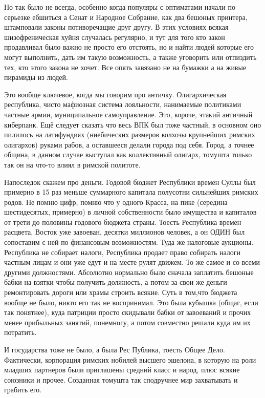 Но так было не всегда, особенно когда популяры с оптиматами начали по серьезке ебшиться а Сенат и Народное Собрание, как два бешоных принтера, штамповали законы потиворечащие друг другу. В этих условиях всякая шизофреническая хуйня случалась регулярно, и тут для того кто закон продавливал было важно не просто его отстоять, но и найти людей которые его могут выполнить, дать им такую возможность, а также уговорить или отпиздить тех, кто этого закона не хочет. Все опять завязано не на бумажки а на живые пирамиды из людей.


Это вообще ключевое, когда мы говорим про античку. Олигархическая республика, чисто мафиозная система лояльности, нанимаемые политиками частные армии, муниципальное самоуправление. Это, короче, этакий античный киберпанк. Ещё следует сказать что весь ВПК был тоже частный, в основном оно пилилось на латифундиях (ниебических размеров колхозы крупнейших римских олигархов) руками рабов, а оставшееся делали города под себя. Город, а точнее община, в данном случае выступал как коллективный олигарх, томушта только так он на что-то влиял в римской политоте.


Напоследок скажем про деньги. Годовой бюджет Республики времен Суллы был примерно в 15 раз меньше суммарного капитала полусотни сильнейших римских родов. Не помню цифр, помню что у одного Красса, на пике (середина шестидесятых, примерно) в личной собственности было имущества и капиталов от трети до половины годового бюджета страны. Тоесть Республика времен расцвета, Восток уже завоеван, десятки миллионов человек, а он ОДИН был сопоставим с ней по финансовым возможностям. Туда же налоговые аукционы. Республика не собирает налоги, Республика продает право собирать налоги частным лицам и они уже едут и на месте рулят движем. То же самое и со всеми другими должностями. Абсолютно нормально было сначала заплатить бешоные бабки на взятки чтобы получить должность, а потом за свои же деньги ремонтировать дороги или храмы строить всякие. Суть в том,что бюджета вообще не было, никто его так не воспринимал. Это была кубышка (общаг, если так понятнее), куда патриции просто скидывали бабки от завоеваний и прочих менее прибыльных занятий, понемногу, а потом совместно решали куда им их потратить.


И государства тоже не было, а была Рес Публика, тоесть Общее Дело. Фактически, корпорация римских нобилей высшего эшелона, в которую на роли младших партнеров были приглашены средний класс и народ, плюс всякие союзники и прочее. Созданная томушта так сподручнее мир захватывать и грабить его.


